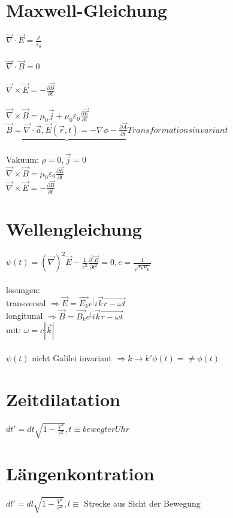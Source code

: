 \documentclass[10pt,a4paper]{article}
\begin{document}
\section{Maxwell-Gleichung}
$\vec\nabla\cdot\vec{E}= \frac{\rho}{\varepsilon_0}$\\
%
\\
$\vec\nabla\cdot\vec{B}=0$\\
%
\\
$\vec\nabla\times\vec{E}=-\frac{\partial\vec{B}}{\partial t}$\\
%
\\
$\vec\nabla\times\vec{B}= \mu_0\vec{j}+\mu_0\varepsilon_0\frac{\partial\vec{E}}{\partial t}$\\
%
$\underbrace{\vec{B}=\vec\nabla\cdot\vec{a},\vec{E}(\vec{r},t) = -\nabla\phi - \frac{\partial \vec{A}}{\partial t}}{Transformationsinvariant}$\\
%
\\
Vakuum: $\rho = 0, \vec{j}=0$\\
$\vec\nabla\times\vec{B}=\mu_0\varepsilon_0\frac{\partial\vec{E}}{\partial t}$\\
$\vec\nabla\times\vec{E}=-\frac{\partial\vec{B}}{\partial t}$\\
\section{Wellengleichung}
$\psi(t)=(\vec{\nabla})^2\vec{E}-\frac{1}{c^2}\frac{\partial^2 \vec{E}}{\partial t^2}=0, c=\frac{1}{\sqrt{\varepsilon_0\mu_0}}$\\
%
\\
lösungen:\\
transversal $\Rightarrow \vec{E}= \vec{E_k}e^[i\vec{k}\vec{r-\omega t}$\\
longitunal $\Rightarrow \vec{B}=\vec{B_k}e^[i\vec{k}\vec{r-\omega t}$\\
mit: $\omega = c|\vec{k}|$\\
%
\\
$\psi(t)$ nicht Galilei invariant $\Rightarrow k \rightarrow k' \phi(t)= \neq\phi(t)$\\
%
\section{Zeitdilatation}
$dt'=dt\sqrt{1-\frac{V^2}{c^2}}, t \equiv bewegter Uhr$\\
%
\section{Längenkontration}
$dl'=dl\sqrt{1-\frac{V^2}{c^2}}, l \equiv$ Strecke aus Sicht der Bewegung\\
%
\end{document}

